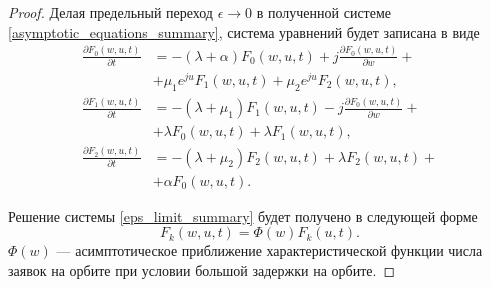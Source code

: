\begin{proof}
	Делая предельный переход $\epsilon\xrightarrow{} 0$  в полученной системе \eqref{asymptotic_equations_summary}, система уравнений будет записана в виде
	\begin{equation} \label{eps_limit_summary}
		\begin{split}
			\frac{{\partial F_{0}(w,u,t)}}{{\partial t}} &= -(\lambda + \alpha)F_{0}(w,u,t) + j
			\frac{{\partial F_{0}(w,u,t)}}{{\partial w}} +\\  &+ \mu_{1} e^{ju}F_{1}(w,u,t) + \mu_{2}e^{ju}F_{2}(w,u,t) ,
			\\
			\frac{{\partial F_{1}(w,u,t)}}{{\partial t}} &= -(\lambda + \mu_{1})F_{1}(w,u,t) - j 
			\frac{{\partial F_{0}(w,u,t)}}{{\partial w}} +\\  &+ \lambda F_{0}(w,u,t) + \lambda F_{1}(w,u,t),
			\\
			\frac{{\partial F_{2}(w,u,t)}}{{\partial t}} &= -(\lambda + \mu_{2})F_{2}(w,u,t)  + \lambda F_{2}(w,u,t) +\\  &+ \alpha F_{0}(w,u,t).
		\end{split}
	\end{equation}  

	Решение системы \eqref{eps_limit_summary} будет получено в следующей форме
	\begin{equation} \label{solution_form_summary}
		F_{k}(w,u,t) = \Phi(w)F_{k}(u,t).
	\end{equation}  
	$\Phi(w)$ --- асимптотическое приближение характеристической функции числа заявок на орбите при условии большой задержки на орбите.
	

\end{proof}
